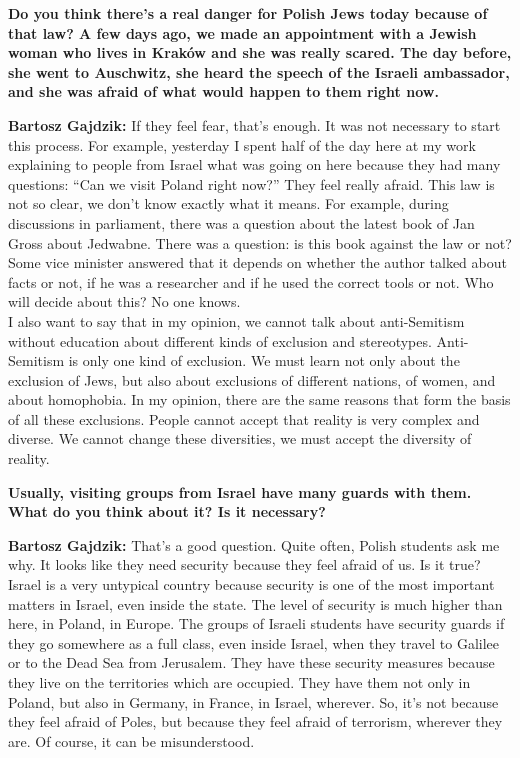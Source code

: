 \textbf{Do you think there’s a real danger for Polish Jews today because of that law? A few days ago, we made an appointment with a Jewish woman who lives in Kraków and she was really scared. The day before, she went to Auschwitz, she heard the speech of the Israeli ambassador, and she was afraid of what would happen to them right now.}  

\textbf{Bartosz Gajdzik:} If they feel fear, that’s enough. It was not necessary to start this process. For example, yesterday I spent half of the day here at my work explaining to people from Israel what was going on here because they had many questions: ``Can we visit Poland right now?'' They feel really afraid. This law is not so clear, we don’t know exactly what it means. For example, during discussions in parliament, there was a question about the latest book of Jan Gross about Jedwabne. There was a question: is this book against the law or not? Some vice minister answered that it depends on whether the author talked about facts or not, if he was a researcher and if he used the correct tools or not. Who will decide about this? No one knows.\\  
I also want to say that in my opinion, we cannot talk about anti-Semitism without education about different kinds of exclusion and stereotypes. Anti-Semitism is only one kind of exclusion. We must learn not only about the exclusion of Jews, but also about exclusions of different nations, of women, and about homophobia. In my opinion, there are the same reasons that form the basis of all these exclusions. People cannot accept that reality is very complex and diverse. We cannot change these diversities, we must accept the diversity of reality.  

\textbf{Usually, visiting groups from Israel have many guards with them. What do you think about it? Is it necessary?} 

\textbf{Bartosz Gajdzik:} That’s a good question. Quite often, Polish students ask me why. It looks like they need security because they feel afraid of us. Is it true? Israel is a very untypical country because security is one of the most important matters in Israel, even inside the state. The level of security is much higher than here, in Poland, in Europe. The groups of Israeli students have security guards if they go somewhere as a full class, even inside Israel, when they travel to Galilee or to the Dead Sea from Jerusalem. They have these security measures because they live on the territories which are occupied. They have them not only in Poland, but also in Germany, in France, in Israel, wherever. So, it’s not because they feel afraid of Poles, but because they feel afraid of terrorism, wherever they are. Of course, it can be misunderstood.  


